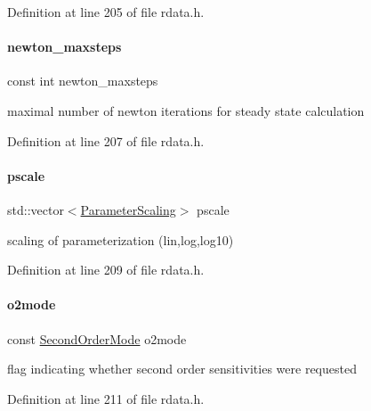 Definition at line 205 of file rdata.\+h.

\mbox{\label{classamici_1_1_return_data_a871e64bbfbd5881a86f21aaff42c3dec}} 
\paragraph{\texorpdfstring{newton\+\_\+maxsteps}{newton\_maxsteps}}
{\footnotesize\ttfamily const int newton\+\_\+maxsteps}

maximal number of newton iterations for steady state calculation 

Definition at line 207 of file rdata.\+h.

\mbox{\label{classamici_1_1_return_data_a5d1c7237dc998202fe1b3393b50f77ce}} 
\paragraph{\texorpdfstring{pscale}{pscale}}
{\footnotesize\ttfamily std\+::vector$<$\mbox{\hyperlink{namespaceamici_a42f062082226e9284c201d9eab71a3a0}{Parameter\+Scaling}}$>$ pscale}

scaling of parameterization (lin,log,log10) 

Definition at line 209 of file rdata.\+h.

\mbox{\label{classamici_1_1_return_data_acc235cad50283f7891e2d834f1cbeb90}} 
\paragraph{\texorpdfstring{o2mode}{o2mode}}
{\footnotesize\ttfamily const \mbox{\hyperlink{namespaceamici_a2d77779286167d5603a870bf9f6c21ba}{Second\+Order\+Mode}} o2mode}

flag indicating whether second order sensitivities were requested 

Definition at line 211 of file rdata.\+h.

